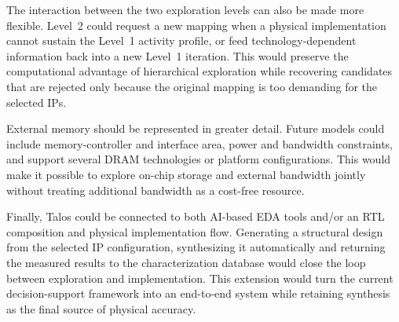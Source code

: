 The interaction between the two exploration levels can also be made
more flexible. Level~2 could request a new mapping when a physical
implementation cannot sustain the Level~1 activity profile, or feed
technology-dependent information back into a new Level~1 iteration.
This would preserve the computational advantage of hierarchical
exploration while recovering candidates that are rejected only because
the original mapping is too demanding for the selected IPs.

External memory should be represented in greater detail. Future models
could include memory-controller and interface area, power and bandwidth
constraints, and support several DRAM technologies or platform
configurations. This would make it possible to explore on-chip storage
and external bandwidth jointly without treating additional bandwidth
as a cost-free resource.

Finally, Talos could be connected to both AI-based EDA tools and/or an RTL composition and physical
implementation flow. Generating a structural design from the selected
IP configuration, synthesizing it automatically and returning the
measured results to the characterization database would close the loop
between exploration and implementation. This extension would turn the
current decision-support framework into an end-to-end system while
retaining synthesis as the final source of physical accuracy.
